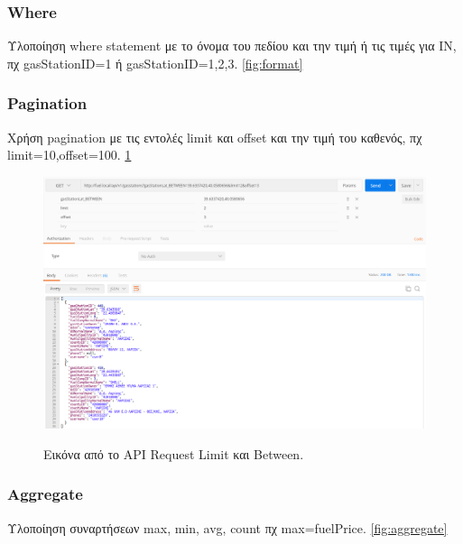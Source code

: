 \subsubsection{Where}
Υλοποίηση where statement με το όνομα του πεδίου και την τιμή ή τις τιμές για IN, πχ   gasStationID=1 ή  gasStationID=1,2,3. \ref{fig:format}

\subsubsection{Pagination}
Χρήση pagination με τις εντολές limit και offset και την τιμή του καθενός, πχ limit=10,offset=100. \ref{fig:limit}

\begin{figure}[H]
  \caption{Εικόνα από το API Request Limit και Between.}
  \centering
    \includegraphics[width=1\textwidth]{img/limit.png}
    \label{fig:limit}
\end{figure}

\subsubsection{Aggregate}
Υλοποίηση συναρτήσεων max, min, avg, count πχ  max=fuelPrice. \ref{fig:aggregate}

